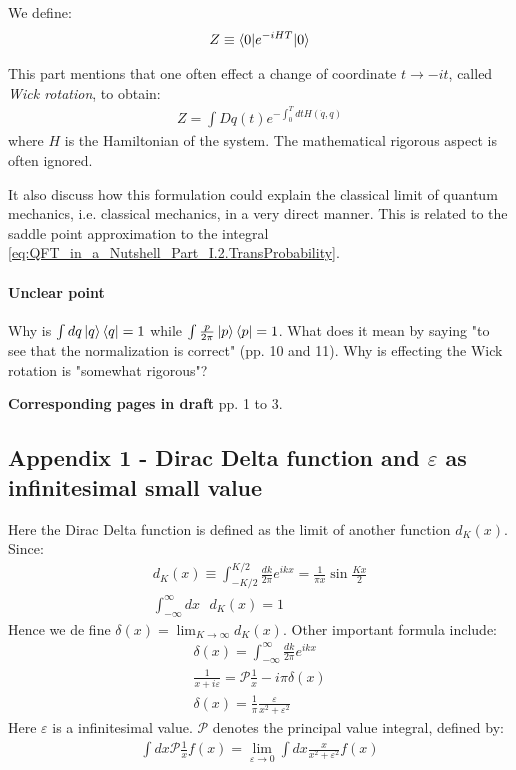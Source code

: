 \documentclass{book}
\numberwithin{equation}{subsection} %
\theoremstyle{definition}
\begin{document}
We define:
\begin{align}
    Z\equiv \braket{0|e^{-iHT}|0}
\end{align}

This part mentions that one often effect a change of coordinate
$t \to -it$, called \textit{Wick rotation}, to obtain:
\begin{align}
    Z = \int Dq(t) e^{-\int_0^T dt H(\dot{q},q)}
\end{align}
where $H$ is the Hamiltonian of the system.
The mathematical rigorous aspect is often ignored.

It also discuss how this formulation could explain the classical
limit of quantum mechanics, i.e. classical mechanics, in a
very direct manner. This is related to the saddle point
approximation to the integral 
\ref{eq:QFT_in_a_Nutshell_Part_I.2.TransProbability}.

\paragraph{Unclear point}
Why is $\int dq \ket{q}\bra{q} = 1$ while $\int \frac{p}{2\pi}
\ket{p}\bra{p} = 1$. What does it mean by saying
"to see that the normalization is correct" (pp. 10 and 11).
Why is effecting the Wick rotation is "somewhat rigorous"?

\textbf{Corresponding pages in draft} pp. 1 to 3.

    \subsection{Appendix 1 - Dirac Delta function and
        \texorpdfstring{$\varepsilon$}{} as infinitesimal
        small value}

    Here the Dirac Delta function is defined as the limit of another
    function $d_K(x)$. Since:
    \begin{align}
        d_K(x) \equiv \int_{-K/2}^{K/2} \frac{dk}{2\pi} e^{ikx} = 
            \frac{1}{\pi x}\sin\frac{Kx}{2}\\
        \int_{-\infty}^{\infty} dx\text{ } d_K(x) = 1
    \end{align}
    Hence we de fine $\delta(x) = \lim_{K\to \infty}d_K(x)$.
    Other important formula include:
    \begin{align}
        \delta(x) = \int_{-\infty}^{\infty} \frac{dk}{2\pi}e^{ikx} \\
        \frac{1}{x+i\varepsilon} = \mathcal{P}\frac{1}{x}-i\pi \delta(x)\\
        \delta(x) = \frac{1}{\pi}\frac{\varepsilon}{x^2+\varepsilon^2}
    \end{align}
    Here $\varepsilon$ is a infinitesimal value. $\mathcal{P}$ denotes the
    principal value integral, defined by:
    \begin{align}
        \int dx \mathcal{P}\frac{1}{x}f(x) = \lim_{\varepsilon\to 0}
            \int dx \frac{x}{x^2+\varepsilon^2}f(x)
    \end{align}
\end{document}
